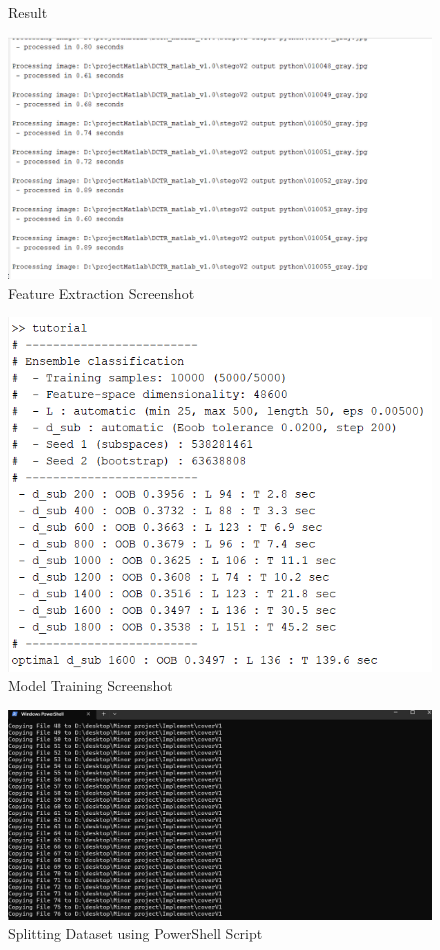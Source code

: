 \begin{enumerate}
\begin{figure}[H]
    \caption{Result}
\end{figure}
\begin{figure}[H]
    \centering
    \includegraphics[width=150mm]{./img/feature_extraction.png}
    \caption{Feature Extraction Screenshot}
\end{figure}
\begin{figure}[H]
    \centering
    \includegraphics[width=150mm]{./img/training.png}
    \caption{Model Training Screenshot}
\end{figure}
\begin{figure}[H]
    \centering
    \includegraphics[width=150mm]{./img/splitting.png}
    \caption{Splitting Dataset using PowerShell Script}
\end{figure}

\end{enumerate}